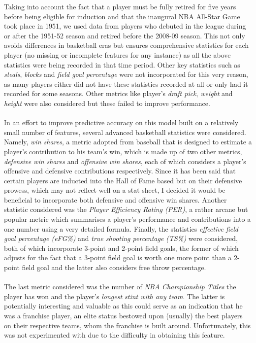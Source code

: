 \documentclass[paper=a4, fontsize=11pt]{scrartcl} %
\numberwithin{equation}{section} %
\numberwithin{figure}{section} %
\numberwithin{table}{section} %
\begin{document}
Taking into account the fact that a player must be fully retired for five years before being eligible for induction\cite{hof_guidelines} and that the inaugural NBA All-Star Game took place in 1951, we used data from players who debuted in the league during or after the 1951-52 season and retired before the 2008-09 season. This not only avoids differences in basketball eras but ensures comprehensive statistics for each player (no missing or incomplete features for any instance) as all the above statistics were being recorded in that time period. Other key statistics such as \textit{steals}, \textit{blocks} and \textit{field goal percentage} were not incorporated for this very reason, as many players either did not have these statistics recorded at all or only had it recorded for some seasons. Other metrics like player's \textit{draft pick}, \textit{weight} and \textit{height} were also considered but these failed to improve performance.\\ %
\\
In an effort to improve predictive accuracy on this model built on a relatively small number of features, several advanced basketball statistics were considered. Namely, \textit{win shares}\cite{win_share}, a metric adopted from baseball that is designed to estimate a player's contribution to his team's win, which is made up of two other metrics, \textit{defensive win shares} and \textit{offensive win shares}, each of which considers a player's offensive and defensive contributions respectively. Since it has been said that certain players are inducted into the Hall of Fame based but on their defensive prowess, which may not reflect well on a stat sheet, I decided it would be beneficial to incorporate both defensive and offensive win shares. Another statistic considered was the \textit{Player Efficiency Rating (PER)}, a rather arcane but popular metric which summarises a player's performance and contributions into a one number using a very detailed formula\cite{per}. Finally, the statistics \textit{effective field goal percentage (eFG\%)} and \textit{true shooting percentage (TS\%)} were considered, both of which incorporate 3-point and 2-point field goals, the former of which adjusts for the fact that a 3-point field goal is worth one more point than a 2-point field goal and the latter also considers free throw percentage.\\
\\
The last metric considered was the number of \textit{NBA Championship Titles} the player has won and the player's \textit{longest stint with any team}. The latter is potentially interesting and valuable as this could serve as an indication that he was a franchise player, an elite status bestowed upon (usually) the best players on their respective teams, whom the franchise is built around. Unfortunately, this was not experimented with due to the difficulty in obtaining this feature.\\
\end{document}
